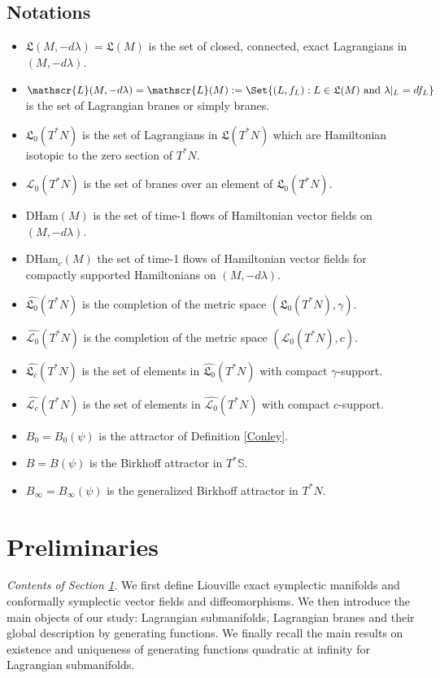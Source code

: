 \documentclass{article}
\newcommand{\1}{\mathbbm{1}}
\theoremstyle{remark}
\begin{document}
\subsection{Notations}
\begin{itemize}
\item $\mathfrak{L}(M, -d\lambda) = \mathfrak{L}(M)$ is the set of closed, connected, exact Lagrangians in $(M, -d\lambda)$. 
\item $\mathscr{L}(M, -d\lambda) = \mathscr{L}(M) := \Set{(L, f_L): L \in \mathfrak{L}(M) \text{ and } \lambda\vert_{L} = df_L }$ is the set of Lagrangian branes or simply branes. 
\item $\mathfrak{L}_0(T^*N)$ is the set of Lagrangians in $\mathfrak{L}(T^*N)$ which are Hamiltonian isotopic to the zero section of $T^*N$. 
\item ${\mathscr L}_0(T^*N)$ is the set of branes over an element of $\mathfrak L_0(T^*N)$.
\item $\mathrm{DHam}(M)$ is the set of time-1 flows of Hamiltonian vector fields on $(M, -d\lambda)$.
\item $\mathrm{DHam}_c(M)$ the set of time-1 flows of Hamiltonian vector fields for compactly supported Hamiltonians on $(M, -d\lambda)$. 
\item $\widehat{\mathfrak{L}_0}(T^*N)$ is the completion of the metric space $(\mathfrak{L}_0(T^*N),\gamma)$. 
\item $\widehat{\mathscr{L}_0}(T^*N)$ is the completion of the metric space $(\mathscr{L}_0(T^*N),c)$.
\item $\widehat{\mathfrak{L}_c}(T^*N)$ is the set of elements in $\widehat{\mathfrak{L}_0}(T^*N)$ with compact $\gamma$-support.
\item $\widehat{\mathscr{L}_c}(T^*N)$ is the set of elements in $\widehat{\mathscr{L}_0}(T^*N)$ with compact $c$-support.
\item $B_0 = B_0(\psi)$ is the attractor of Definition \ref{Conley}.
\item $B = B(\psi)$ is the Birkhoff attractor in $T^*\mathbb{S}$.
\item $B_{\infty} = B_{\infty}(\psi)$ is the generalized Birkhoff attractor in $T^*N$.
\end{itemize}

\section{Preliminaries} \label{PRE}
\begin{center}
\begin{minipage}{10 cm}
\textit{Contents of Section \ref{PRE}.} We first define Liouville exact symplectic manifolds and conformally symplectic vector fields and diffeomorphisms. We then introduce the main objects of our study: Lagrangian submanifolds, Lagrangian branes and their global description by generating functions. We finally recall the main results on existence and uniqueness of generating functions quadratic at infinity for Lagrangian submanifolds.
\end{minipage}
\end{center}
\end{document}
